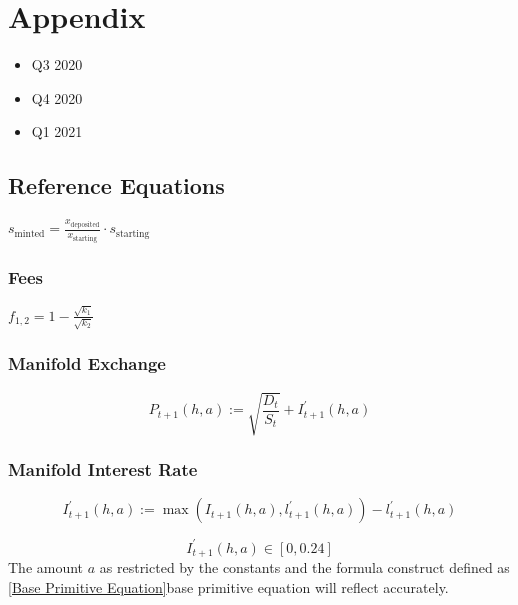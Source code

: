 \newpage

\chapter{Appendix}

\begin{itemize}
    \item Q3 2020
    \item Q4 2020
    \item Q1 2021
\end{itemize}



\section{Reference Equations}


$
s_{\text {minted}}=\frac{x_{\text {deposited}}}{x_{\text {starting}}} \cdot s_{\text {starting}}
$

\subsection{Fees}
$
f_{1,2}=1-\frac{\sqrt{k_{1}}}{\sqrt{k_{2}}}
$



\subsection{Manifold Exchange}
\begin{equation}
    P_{t+1}(h, a):=\sqrt{\frac{D_{t}}{S_{t}}}+I_{t+1}^{\prime}(h, a)
\end{equation}


\subsection{Manifold Interest Rate}
\begin{equation}
I_{t+1}^{\prime}(h, a):=\max \left(I_{t+1}(h, a), l_{t+1}^{\prime}(h, a)\right)-l_{t+1}^{\prime}(h, a)
\end{equation}

\begin{equation}
    I_{t+1}^{\prime}(h, a) \in[0,0.24]
\end{equation}
The amount $a$ as restricted by the constants and the formula construct defined as \ref{Base Primitive Equation}base primitive equation will reflect accurately.

